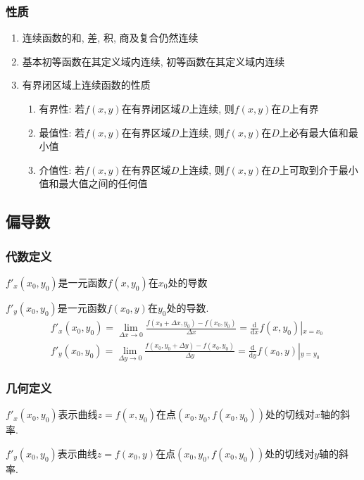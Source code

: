 \subsubsection{性质}
\begin{enumerate}
\item 连续函数的和, 差, 积, 商及复合仍然连续
\item 基本初等函数在其定义域内连续, 初等函数在其定义域内连续
\item 有界闭区域上连续函数的性质
\begin{enumerate}
\item 有界性: 若$ f(x,y) $在有界闭区域$ D $上连续, 则$ f(x,y) $在$ D $上有界
\item 最值性: 若$ f(x,y) $在有界区域$ D $上连续, 则$ f(x,y) $在$ D $上必有最大值和最小值
\item 介值性: 若$ f(x,y) $在有界区域$ D $上连续, 则$ f(x,y) $在$ D $上可取到介于最小值和最大值之间的任何值
\end{enumerate}
\end{enumerate}
\subsection{偏导数}
\subsubsection{代数定义}
$ f'_{x}(x_{0},y_{0}) $是一元函数$ f(x,y_{0}) $在$ x_{0} $处的导数 \par \vspace{.5em}
$ f'_{y}(x_{0},y_{0}) $是一元函数$ f(x_{0},y) $在$ y_{0} $处的导数.
\begin{equation*}
\begin{aligned}
& f'_{x}(x_{0},y_{0})=\lim\limits_{\Delta x \rightarrow 0}\frac{f(x_{0}+\Delta x,y_{0})-f(x_{0},y_{0})}{\Delta x}=\frac{\mathrm{d}}{\mathrm{d}x}f(x,y_{0})\left|_{x=x_{0}}\right. \\
& f'_{y}(x_{0},y_{0})=\lim\limits_{\Delta y \rightarrow 0}\frac{f(x_{0},y_{0}+\Delta y)-f(x_{0},y_{0})}{\Delta y}=\frac{\mathrm{d}}{\mathrm{d}y}f(x_{0},y)\left|_{y=y_{0}}\right.
\end{aligned}
\end{equation*}
\subsubsection{几何定义}
$ f'_{x}(x_{0},y_{0}) $表示曲线$ z=f(x,y_{0}) $在点$ (x_{0},y_{0},f(x_{0},y_{0})) $处的切线对$ x $轴的斜率.\par \vspace{.5em}
$ f'_{y}(x_{0},y_{0}) $表示曲线$ z=f(x_{0},y) $在点$ (x_{0},y_{0},f(x_{0},y_{0})) $处的切线对$ y $轴的斜率.
